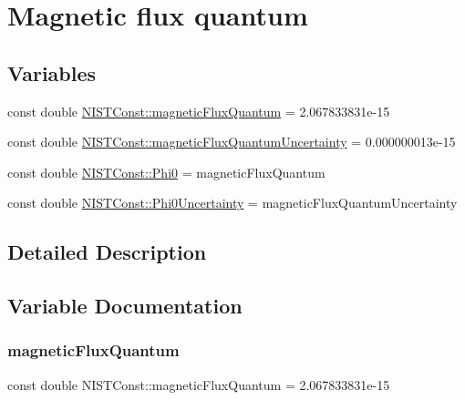 \hypertarget{group___n_i_s_t_const-_magnetic_flux_quantum}{}\section{Magnetic flux quantum}
\label{group___n_i_s_t_const-_magnetic_flux_quantum}
\subsection*{Variables}
\begin{DoxyCompactItemize}
\item 
const double \hyperlink{group___n_i_s_t_const-_magnetic_flux_quantum_ga2ed9e5fb19a6f2cc0c25ad945ea6b562}{N\+I\+S\+T\+Const\+::magnetic\+Flux\+Quantum} = 2.\+067833831e-\/15
\item 
const double \hyperlink{group___n_i_s_t_const-_magnetic_flux_quantum_gabb501bffb2a565762d9f4bde15f859b6}{N\+I\+S\+T\+Const\+::magnetic\+Flux\+Quantum\+Uncertainty} = 0.\+000000013e-\/15
\item 
const double \hyperlink{group___n_i_s_t_const-_magnetic_flux_quantum_ga17c4e5dc1a9ccc86990f9236ffbc42a3}{N\+I\+S\+T\+Const\+::\+Phi0} = magnetic\+Flux\+Quantum
\item 
const double \hyperlink{group___n_i_s_t_const-_magnetic_flux_quantum_ga55c653d0966d0e6adb13e664c811d394}{N\+I\+S\+T\+Const\+::\+Phi0\+Uncertainty} = magnetic\+Flux\+Quantum\+Uncertainty
\end{DoxyCompactItemize}


\subsection{Detailed Description}


\subsection{Variable Documentation}
\mbox{\label{group___n_i_s_t_const-_magnetic_flux_quantum_ga2ed9e5fb19a6f2cc0c25ad945ea6b562}} 
\subsubsection{\texorpdfstring{magnetic\+Flux\+Quantum}{magneticFluxQuantum}}
{\footnotesize\ttfamily const double N\+I\+S\+T\+Const\+::magnetic\+Flux\+Quantum = 2.\+067833831e-\/15}

